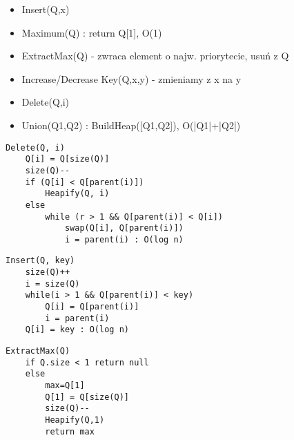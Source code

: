 \documentclass{article}
\numberwithin{equation}{subsection}
\begin{document}
\begin{itemize}
    \item Insert(Q,x)
    \item Maximum(Q) : return Q[1], O(1)
    \item ExtractMax(Q) - zwraca element o najw. priorytecie, usuń z Q
    \item Increase/Decrease Key(Q,x,y) - zmieniamy z x na y
    \item Delete(Q,i)
    \item Union(Q1,Q2) : BuildHeap([Q1,Q2]), O(|Q1|+|Q2|)
\end{itemize}

\begin{verbatim}
Delete(Q, i)
    Q[i] = Q[size(Q)]
    size(Q)--
    if (Q[i] < Q[parent(i)])
        Heapify(Q, i)
    else
        while (r > 1 && Q[parent(i)] < Q[i])
            swap(Q[i], Q[parent(i)])
            i = parent(i) : O(log n)
\end{verbatim}

\begin{verbatim}
Insert(Q, key)
    size(Q)++
    i = size(Q)
    while(i > 1 && Q[parent(i)] < key)
        Q[i] = Q[parent(i)]
        i = parent(i)
    Q[i] = key : O(log n)
\end{verbatim}

\begin{verbatim}
ExtractMax(Q)
    if Q.size < 1 return null
    else
        max=Q[1]
        Q[1] = Q[size(Q)]
        size(Q)--
        Heapify(Q,1)
        return max
\end{verbatim}
\end{document}
